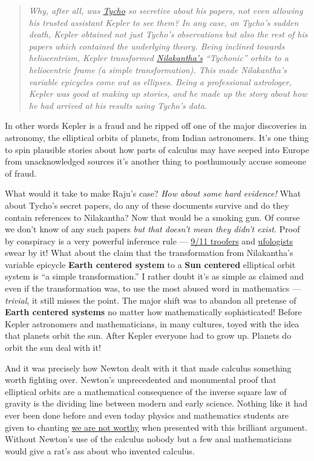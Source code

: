 \begin{quotation}
\emph{Why, after all, was
\href{http://en.wikipedia.org/wiki/Tycho\_Brahe}{Tycho} so secretive
about his papers, not even allowing his trusted assistant Kepler to see
them? In any case, on Tycho's sudden death, Kepler obtained not just
Tycho's observations but also the rest of his papers which contained the
underlying theory. Being inclined towards heliocentrism, Kepler
transformed
\href{http://en.wikipedia.org/wiki/Nilakantha\_Somayaji}{Nilakantha's}
``Tychonic'' orbits to a heliocentric frame (a simple transformation).
This made Nilakantha's variable epicycles come out as ellipses. Being a
professional astrologer, Kepler was good at making up stories, and he
made up the story about how he had arrived at his results using Tycho's
data.}
\end{quotation}

In other words Kepler is a fraud and he ripped off one of the major
discoveries in astronomy, the elliptical orbits of planets, from Indian
astronomers. It's one thing to spin plausible stories about how parts of
calculus may have seeped into Europe from unacknowledged sources it's
another thing to posthumously accuse someone of fraud.

What would it take to make Raju's case? \emph{How about some hard
evidence!} What about Tycho's secret papers, do any of these documents
survive and do they contain references to Nilakantha? Now that would be
a smoking gun. Of course we don't know of any such papers \emph{but that
doesn't mean they didn't exist.} Proof by conspiracy is a very powerful
inference rule ---
\href{http://www.urbandictionary.com/define.php?term=troofer}{9/11
troofers} and \href{http://mw4.m-w.com/dictionary/ufologist}{ufologists}
swear by it! What about the claim that the transformation from
Nilakantha's variable epicycle \textbf{Earth centered system} to a
\textbf{Sun centered} elliptical orbit system is ``a simple
transformation.'' I rather doubt it's as simple as claimed and even if
the transformation was, to use the most abused word in mathematics ---
\emph{trivial}, it still misses the point. The major shift was to
abandon all pretense of \textbf{Earth centered systems} no matter how
mathematically sophisticated! Before Kepler astronomers and
mathematicians, in many cultures, toyed with the idea that planets orbit
the sun. After Kepler everyone had to grow up. Planets do orbit the sun
deal with it!

And it was precisely how Newton dealt with it that made calculus
something worth fighting over. Newton's unprecedented and monumental
proof that elliptical orbits are a mathematical consequence of the
inverse square law of gravity is the dividing line between modern and
early science. Nothing like it had ever been done before and even today
physics and mathematics students are given to chanting
\href{http://www.youtube.com/watch?v=-FucbvoFFy0}{we are not worthy}
when presented with this brilliant argument. Without Newton's use of the
calculus nobody but a few anal mathematicians would give a rat's ass
about who invented calculus.

